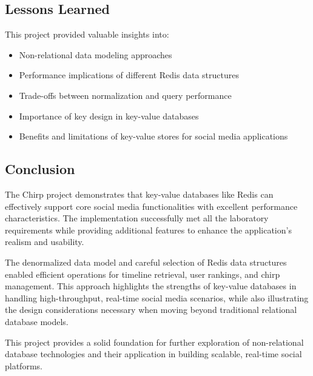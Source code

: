 \documentclass[a4paper,11pt]{article}
\begin{document}
\subsection{Lessons Learned}
This project provided valuable insights into:

\begin{itemize}
    \item Non-relational data modeling approaches
    \item Performance implications of different Redis data structures
    \item Trade-offs between normalization and query performance
    \item Importance of key design in key-value databases
    \item Benefits and limitations of key-value stores for social media applications
\end{itemize}

\subsection{Conclusion}
The Chirp project demonstrates that key-value databases like Redis can effectively support core social media functionalities with excellent performance characteristics. The implementation successfully met all the laboratory requirements while providing additional features to enhance the application's realism and usability.

The denormalized data model and careful selection of Redis data structures enabled efficient operations for timeline retrieval, user rankings, and chirp management. This approach highlights the strengths of key-value databases in handling high-throughput, real-time social media scenarios, while also illustrating the design considerations necessary when moving beyond traditional relational database models.

This project provides a solid foundation for further exploration of non-relational database technologies and their application in building scalable, real-time social platforms.
\end{document}
